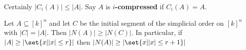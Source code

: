 \documentclass{article}
\begin{document}
Certainly $|C_i(A)| \leq |A|$.
Say $A$ is \textbf{$i$-compressed} if $C_i(A) = A$.
\begin{nthm}
  Let $A \subseteq [k]^n$ and let $C$ be the initial segment of the simplicial order on $[k]^n$ with $|C| = |A|$.
  Then $|N(A)| \geq |N(C)|$. In particular, if $|A| \geq |\set{x | |x|\leq r}|$ then $|N(A)| \geq |\set{x | |x| \leq r+1}|$
\end{nthm}
\end{document}
